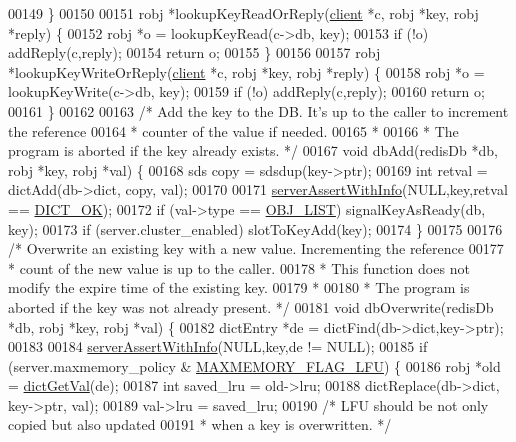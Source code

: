 \begin{DoxyCode}
00149 \}
00150 
00151 robj *lookupKeyReadOrReply(\hyperlink{structclient}{client} *c, robj *key, robj *reply) \{
00152     robj *o = lookupKeyRead(c->db, key);
00153     \textcolor{keywordflow}{if} (!o) addReply(c,reply);
00154     \textcolor{keywordflow}{return} o;
00155 \}
00156 
00157 robj *lookupKeyWriteOrReply(\hyperlink{structclient}{client} *c, robj *key, robj *reply) \{
00158     robj *o = lookupKeyWrite(c->db, key);
00159     \textcolor{keywordflow}{if} (!o) addReply(c,reply);
00160     \textcolor{keywordflow}{return} o;
00161 \}
00162 
00163 \textcolor{comment}{/* Add the key to the DB. It's up to the caller to increment the reference}
00164 \textcolor{comment}{ * counter of the value if needed.}
00165 \textcolor{comment}{ *}
00166 \textcolor{comment}{ * The program is aborted if the key already exists. */}
00167 \textcolor{keywordtype}{void} dbAdd(redisDb *db, robj *key, robj *val) \{
00168     sds copy = sdsdup(key->ptr);
00169     \textcolor{keywordtype}{int} retval = dictAdd(db->dict, copy, val);
00170 
00171     \hyperlink{server_8h_a7308f76cbff9a8d3797fe78190b91282}{serverAssertWithInfo}(NULL,key,retval == \hyperlink{dict_8h_a2afecbeab8f7efbc183048f52f6d17e5}{DICT\_OK});
00172     \textcolor{keywordflow}{if} (val->type == \hyperlink{server_8h_a4a5f22a280949c97a0cb0d4213275126}{OBJ\_LIST}) signalKeyAsReady(db, key);
00173     \textcolor{keywordflow}{if} (server.cluster\_enabled) slotToKeyAdd(key);
00174 \}
00175 
00176 \textcolor{comment}{/* Overwrite an existing key with a new value. Incrementing the reference}
00177 \textcolor{comment}{ * count of the new value is up to the caller.}
00178 \textcolor{comment}{ * This function does not modify the expire time of the existing key.}
00179 \textcolor{comment}{ *}
00180 \textcolor{comment}{ * The program is aborted if the key was not already present. */}
00181 \textcolor{keywordtype}{void} dbOverwrite(redisDb *db, robj *key, robj *val) \{
00182     dictEntry *de = dictFind(db->dict,key->ptr);
00183 
00184     \hyperlink{server_8h_a7308f76cbff9a8d3797fe78190b91282}{serverAssertWithInfo}(NULL,key,de != NULL);
00185     \textcolor{keywordflow}{if} (server.maxmemory\_policy & \hyperlink{server_8h_aac2d3ad7a604f87e06e25233dbd01c9b}{MAXMEMORY\_FLAG\_LFU}) \{
00186         robj *old = \hyperlink{dict_8h_ae8d2cc391873b2bea2b87c4f80f43120}{dictGetVal}(de);
00187         \textcolor{keywordtype}{int} saved\_lru = old->lru;
00188         dictReplace(db->dict, key->ptr, val);
00189         val->lru = saved\_lru;
00190         \textcolor{comment}{/* LFU should be not only copied but also updated}
00191 \textcolor{comment}{         * when a key is overwritten. */}

\end{DoxyCode}
